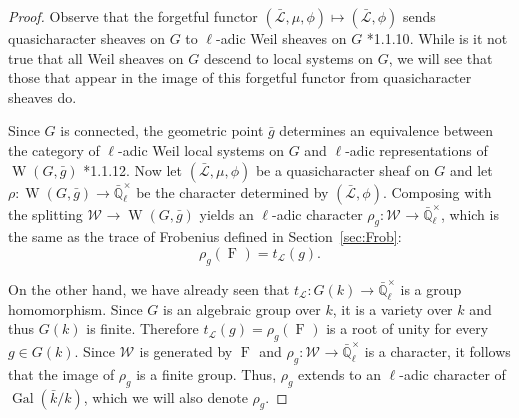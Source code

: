 \documentclass{amsart}
\theoremstyle{plain}
\theoremstyle{definition}
\theoremstyle{remark}
\newcommand{\EE}{\mathbb{\bar Q}_\ell}
\newcommand{\bFq}{\bar{k}}
\newcommand{\Fq}{k}
\newcommand{\EEx}{\EE^\times}
\newcommand{\Weil}[1]{\mathcal{W}_{#1}}
\DeclareMathOperator{\Gal}{Gal}
\DeclareMathOperator{\W}{W}
\newcommand{\Frob}[1]{\operatorname{F}_{#1}}
\newcommand{\qcs}[1]{{\mathcal{#1}}}
\newcommand{\gqcs}[1]{{\mathcal{\bar #1}}}
\newcommand{\trFrob}[1]{t_{#1}}
\newcommand{\bg}{\bar{g}}
\begin{document}
\begin{proof}
  Observe that the forgetful functor $(\gqcs{L},\mu,\phi) \mapsto (\gqcs{L},\phi)$
  sends quasicharacter sheaves on $G$ to $\ell$-adic Weil sheaves on $G$ \cite{deligne:80a}*{1.1.10}.
  While is it not true that all Weil sheaves on $G$ descend to local systems on $G$, 
  we will see that those that appear in the image of this forgetful functor from quasicharacter sheaves do. 

  Since $G$ is connected, the geometric point $\bg$ determines
  an equivalence between the category of $\ell$-adic Weil local systems on $G$ and
  $\ell$-adic representations of $\W(G,\bg)$ \cite{deligne:80a}*{1.1.12}.
  Now let $(\gqcs{L},\mu,\phi)$ be a quasicharacter sheaf on $G$ 
  and let $\rho : \W(G, \bg) \to \EEx$ be the character determined by $(\gqcs{L},\phi)$.
  Composing with the splitting $\Weil{} \to \W(G,\bg)$ yields an $\ell$-adic character
  $\rho_g : \Weil{} \to \EEx$, which is the same as the trace of Frobenius defined in Section~\ref{sec:Frob}:
  \[
  \rho_g(\Frob{}) =  \trFrob{\qcs{L}}(g).
  \]
  
  On the other hand, we have already seen that $\trFrob{\qcs{L}} : G(\Fq) \to \EEx$
  is a group homomorphism. Since $G$ is an algebraic group over $\Fq$, it is a
  variety over $\Fq$ and thus $G(\Fq)$ is finite.
  Therefore $\trFrob{\qcs{L}}(g) = \rho_g(\Frob{})$ is a root of unity
  for every $g\in G(\Fq)$.  Since $\Weil{}$ is generated by
  $\Frob{}$ and $\rho_g : \Weil{} \to \EEx$ is
  a character, it follows that the image of $\rho_g$ is a finite group.
  Thus, $\rho_g$ extends to an $\ell$-adic character of $\Gal(\bFq/\Fq)$, 
  which we will also denote $\rho_g$.


\end{proof}
\end{document}
